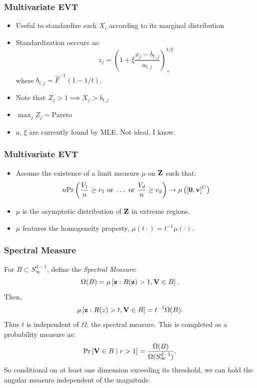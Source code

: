\documentclass[aspectratio=169]{beamer}
\begin{document}
\begin{frame}
  \frametitle{Multivariate EVT}
  \begin{itemize}
    \item Useful to standardize each $X_i$ according to its marginal distribution
    \item Standardization occcurs as:
      \begin{equation*}
        z_j = \left(1 + \xi\frac{x_j - b_{t,j}}{a_{t,j}}\right)_{+}^{1/\xi}
      \end{equation*}
			where $b_{t,j} = \hat{F}^{-1}(1 - 1/t)$.
    \item Note that $Z_j > 1\implies X_j > b_{t,j}$
    \item $\max_j Z_j \sim \text{Pareto}$
		\item $a$, $\xi$ are currently found by MLE.  Not ideal, I know.
  \end{itemize}
\end{frame}

\begin{frame}
  \frametitle{Multivariate EVT}
  \begin{itemize}
    \item Assume the existence of a limit measure $\mu$ on ${\bf Z}$ such that:
    \begin{equation*}
      n\text{Pr}\left(\frac{V_1}{n} \geq v_1 \text{ or }\ldots\text{ or }\frac{V_d}{n}\geq v_d\right)
      \rightarrow \mu\left([{\bf 0}, {\bf v}]^C\right)
    \end{equation*}
    \item $\mu$ is the asymptotic distribution of ${\bf Z}$ in extreme regions.
    \item $\mu$ features the homogeneity property, $\mu(t\cdot) = t^{-1}\mu(\cdot)$.
  \end{itemize}
\end{frame}

\begin{frame}
  \frametitle{Spectral Measure}
  For $B \subset S_{\infty}^{d-1}$, define the \emph{Spectral Measure}:
  \begin{equation*}
    \Omega(B) = \mu\left[{\bf z}: R({\bf z}) > 1, {\bf V} \in B\right].
  \end{equation*}
  Then,
  \begin{equation*}
    \mu\left[{\bf z}:R(z)>t, {\bf V}\in B\right] = t^{-1}\Omega(B).
  \end{equation*}
  Thus $t$ is independent of $\Omega$, the spectral measure.  This is completed as a
    probability measure as:
  \begin{equation*}
    \text{Pr}\left[{\bf V} \in B \mid r > 1\right] = \frac{\Omega(B)}{\Omega(S_{\infty}^{d-1})}.
  \end{equation*}
  So conditional on at least one dimension exceeding its threshold, we can hold the
  angular measure independent of the magnitude.
\end{frame}
\end{document}
